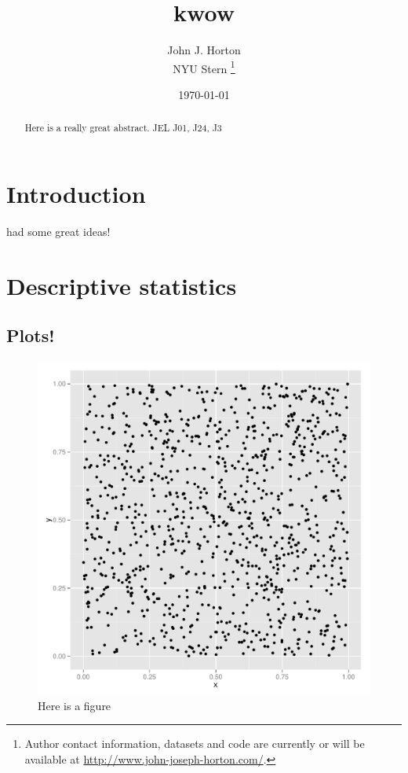 \documentclass[11pt]{article}
\begin{document}
 

\title{ kwow }

\date{\today}

\author{ John J. Horton \\ NYU Stern \footnote{ Author contact information, datasets and code are currently or will be available at \href{http://www.john-joseph-horton.com/}{http://www.john-joseph-horton.com/}. } }
\maketitle

\begin{abstract}
\noindent  Here is a really great abstract.  \newline
\noindent JEL J01, J24, J3
\end{abstract} 

\section{Introduction}
\cite{smith1999wealth} had some great ideas! 

\section{Descriptive statistics}





\subsection{Plots!}

\begin{figure}[h]
  \begin{center}
  \caption{Here is a figure} \label{fig:hist}
  \includegraphics[scale=0.25]{plots/hist.pdf}
  \end{center} 
\end{figure}



\end{document}
